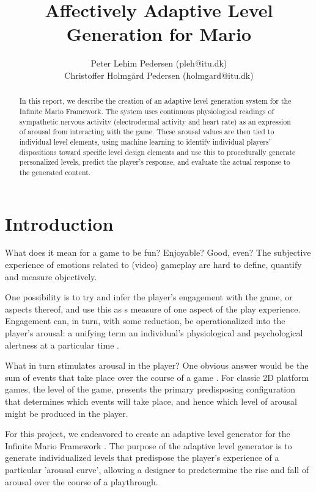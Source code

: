 \documentclass{llncs}
\begin{document}
\title{Affectively Adaptive Level Generation for Mario}
\author{Peter Lehim Pedersen (pleh@itu.dk) \\Christoffer Holmg{\aa}rd Pedersen (holmgard@itu.dk)}
\maketitle
\begin{abstract}
In this report, we describe the creation of an adaptive level generation system for the Infinite Mario Framework.
The system uses continuous physiological readings of sympathetic nervous activity (electrodermal activity and heart rate) as an expression of arousal from interacting with the game.
These arousal values are then tied to individual level elements, using machine learning to identify individual players' dispositions toward specific level design elements and use this to procedurally generate personalized levels, predict the player's response, and evaluate the actual response to the generated content.
\end{abstract}
\section{Introduction}
What does it mean for a game to be fun? Enjoyable? Good, even? The subjective experience of emotions related to (video) gameplay are hard to define, quantify and measure objectively.

One possibility is to try and infer the player's engagement with the game, or aspects thereof, and use this as s measure of one aspect of the play experience.
Engagement can, in turn, with some reduction, be operationalized into the player's arousal: a unifying term an individual's physiological and psychological alertness at a particular time \cite{picard1997affective}.

What in turn stimulates arousal in the player? One obvious answer would be the sum of events that take place over the course of a game \cite{ravaja2005psychophysiology}. For classic 2D platform games, the level of the game, %
presents the primary predisposing configuration that determines which events will take place, and hence which level of arousal might be produced in the player.%

For this project, we endeavored to create an adaptive level generator for the Infinite Mario Framework \cite{marioai}. The purpose of the adaptive level generator is to generate individualized levels that predispose the player's experience of a particular 'arousal curve', allowing a designer to predetermine the rise and fall of arousal over the course of a playthrough.
\end{document}
